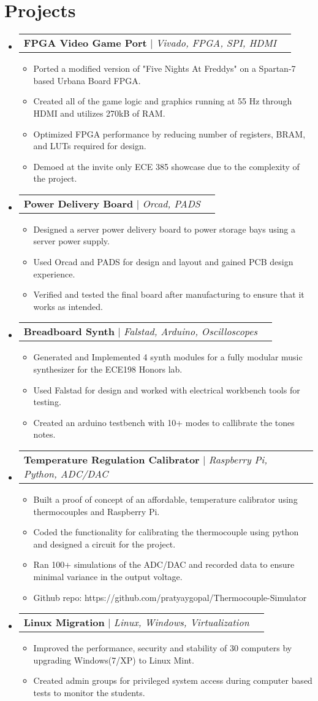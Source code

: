 \documentclass[letterpaper,11pt]{article}
\makeatletter
\newcommand{\resumeItem}[1]{
  \item\small{
    {#1 \vspace{-2pt}}
  }
}
\newcommand{\resumeProjectHeading}[2]{
    \item
    \begin{tabular*}{0.97\textwidth}{l@{\extracolsep{\fill}}r}
      \small#1 & #2 \\
    \end{tabular*}\vspace{-7pt}
}
\newcommand{\resumeSubHeadingListStart}{\begin{itemize}[leftmargin=0.15in, label={}]}
\newcommand{\resumeSubHeadingListEnd}{\end{itemize}}
\newcommand{\resumeItemListStart}{\begin{itemize}}
\newcommand{\resumeItemListEnd}{\end{itemize}\vspace{-5pt}}
\makeatother
\begin{document}
\section{Projects}
    \resumeSubHeadingListStart
        \resumeProjectHeading
          {\textbf{FPGA Video Game Port} $|$ \emph{Vivado, FPGA, SPI, HDMI}}{}
          \resumeItemListStart
            \resumeItem{Ported a modified version of "Five Nights At Freddys" on a Spartan-7 based Urbana Board FPGA.}
            \resumeItem{Created all of the game logic and graphics running at 55 Hz through HDMI and utilizes 270kB of RAM.}
            \resumeItem{Optimized FPGA performance by reducing number of registers, BRAM, and LUTs required for design.}
            \resumeItem{Demoed at the invite only ECE 385 showcase due to the complexity of the project.}
          \resumeItemListEnd
        \resumeProjectHeading
          {\textbf{Power Delivery Board} $|$ \emph{Orcad, PADS}}{}
          \resumeItemListStart
            \resumeItem{Designed a server power delivery board to power storage bays using a server power supply.}
            \resumeItem{Used Orcad and PADS for design and layout and gained PCB design experience.}
            \resumeItem{Verified and tested the final board after manufacturing to ensure that it works as intended.}
          \resumeItemListEnd
        \resumeProjectHeading
          {\textbf{Breadboard Synth} $|$ \emph{Falstad, Arduino, Oscilloscopes}}{}
          \resumeItemListStart
            \resumeItem{Generated and Implemented 4 synth modules for a fully modular music synthesizer for the ECE198 Honors lab.}
            \resumeItem{Used Falstad for design and worked with electrical workbench tools for testing.}
            \resumeItem{Created an arduino testbench with 10+ modes to callibrate the tones notes.}
          \resumeItemListEnd
        \resumeProjectHeading
          {\textbf{Temperature Regulation Calibrator} $|$ \emph{Raspberry Pi, Python, ADC/DAC}}{}
          \resumeItemListStart
            \resumeItem{Built a proof of concept of an affordable, temperature calibrator using thermocouples and Raspberry Pi.}
            \resumeItem{Coded the functionality for calibrating the thermocouple using python and designed a circuit for the project.}
            \resumeItem{Ran 100+ simulations of the ADC/DAC and recorded data to ensure minimal variance in the output voltage.}
            \resumeItem{Github repo: https://github.com/pratyaygopal/Thermocouple-Simulator}
          \resumeItemListEnd

    \resumeProjectHeading
          {\textbf{Linux Migration} $|$ \emph{Linux, Windows, Virtualization}}{}
          \resumeItemListStart
            \resumeItem{Improved the performance, security and stability of 30 computers by upgrading Windows(7/XP) to Linux Mint.}
            \resumeItem{Created admin groups for privileged system access during computer based tests to monitor the students.}
          \resumeItemListEnd
    \resumeSubHeadingListEnd

\end{document}
